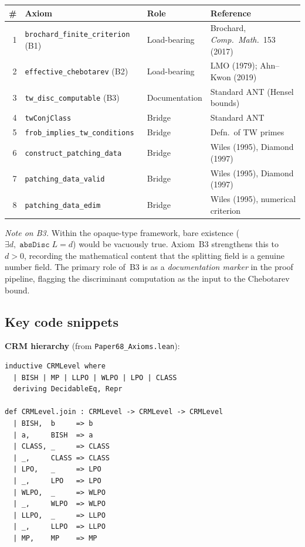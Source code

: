 \documentclass[11pt]{article}
\theoremstyle{plain}
\theoremstyle{definition}
\theoremstyle{remark}
\begin{document}
\begin{center}
\small
\renewcommand{\arraystretch}{1.15}
\begin{tabular}{rlll}
\toprule
\textbf{\#} & \textbf{Axiom} & \textbf{Role} & \textbf{Reference} \\
\midrule
1 & \texttt{brochard\_finite\_criterion} (B1) & Load-bearing &
  Brochard, \textit{Comp.\ Math.}\ 153 (2017) \\
2 & \texttt{effective\_chebotarev} (B2) & Load-bearing &
  LMO (1979); Ahn--Kwon (2019) \\
3 & \texttt{tw\_disc\_computable} (B3) & Documentation &
  Standard ANT (Hensel bounds) \\
4 & \texttt{twConjClass} & Bridge &
  Standard ANT \\
5 & \texttt{frob\_implies\_tw\_conditions} & Bridge &
  Defn.\ of TW primes \\
6 & \texttt{construct\_patching\_data} & Bridge &
  Wiles (1995), Diamond (1997) \\
7 & \texttt{patching\_data\_valid} & Bridge &
  Wiles (1995), Diamond (1997) \\
8 & \texttt{patching\_data\_edim} & Bridge &
  Wiles (1995), numerical criterion \\
\bottomrule
\end{tabular}
\end{center}

\smallskip\noindent
\emph{Note on B3.}  Within the opaque-type framework, bare existence
($\exists d,\; \texttt{absDisc}\;L = d$) would be vacuously true.
Axiom~B3 strengthens this to $d > 0$, recording the mathematical
content that the splitting field is a genuine number field.
The primary role of~B3 is as a \emph{documentation marker} in the
proof pipeline, flagging the discriminant computation as the input
to the Chebotarev bound.

\subsection{Key code snippets}

\textbf{CRM hierarchy} (from \texttt{Paper68\_Axioms.lean}):

\begin{lstlisting}
inductive CRMLevel where
  | BISH | MP | LLPO | WLPO | LPO | CLASS
  deriving DecidableEq, Repr

def CRMLevel.join : CRMLevel -> CRMLevel -> CRMLevel
  | BISH,  b     => b
  | a,     BISH  => a
  | CLASS, _     => CLASS
  | _,     CLASS => CLASS
  | LPO,   _     => LPO
  | _,     LPO   => LPO
  | WLPO,  _     => WLPO
  | _,     WLPO  => WLPO
  | LLPO,  _     => LLPO
  | _,     LLPO  => LLPO
  | MP,    MP    => MP
\end{lstlisting}
\end{document}
